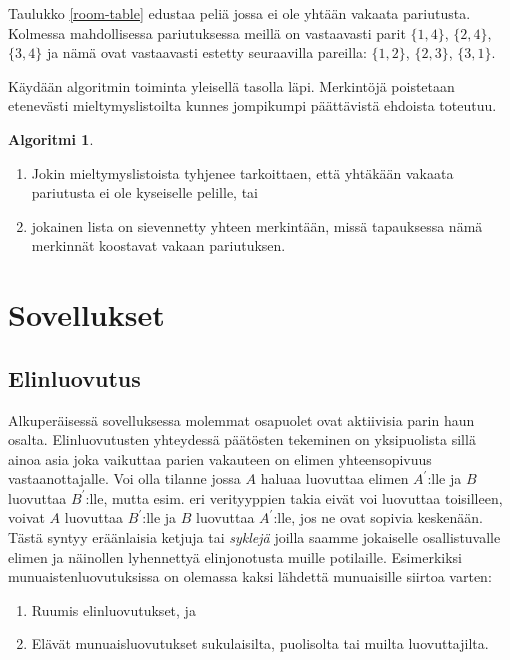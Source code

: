 \documentclass[finnish]{tktltiki2}
\theoremstyle{definition}
\newtheorem{alg}[lau]{Algoritmi}
\theoremstyle{remark}
\begin{document}
Taulukko \ref{room-table} edustaa peliä jossa ei ole yhtään vakaata pariutusta. Kolmessa mahdollisessa pariutuksessa meillä on vastaavasti parit $\{1,4\}$, $\{2,4\}$, $\{3,4\}$ ja nämä ovat vastaavasti estetty seuraavilla pareilla: $\{1,2\}$, $\{2,3\}$, $\{3,1\}$.

Käydään algoritmin toiminta yleisellä tasolla läpi. Merkintöjä poistetaan etenevästi mieltymyslistoilta kunnes jompikumpi päättävistä ehdoista toteutuu. \cite[p, 165]{gusfield1989stable}
\begin{alg}\label{srp1}
\begin{enumerate}
	\item Jokin mieltymyslistoista tyhjenee tarkoittaen, että yhtäkään vakaata pariutusta ei ole kyseiselle pelille, tai
	\item jokainen lista on sievennetty yhteen merkintään, missä tapauksessa nämä merkinnät koostavat vakaan pariutuksen.
\end{enumerate}
\end{alg}

\section{Sovellukset}
\subsection{Elinluovutus}
Alkuperäisessä sovelluksessa molemmat osapuolet ovat aktiivisia parin haun osalta. Elinluovutusten yhteydessä päätösten tekeminen on yksipuolista sillä ainoa asia joka vaikuttaa parien vakauteen on elimen yhteensopivuus vastaanottajalle. Voi olla tilanne jossa $A$ haluaa luovuttaa elimen $A^{'}$:lle ja $B$ luovuttaa $B^{'}$:lle, mutta esim. eri verityyppien takia eivät voi luovuttaa toisilleen, voivat $A$ luovuttaa $B^{'}$:lle ja $B$ luovuttaa $A^{'}$:lle, jos ne ovat sopivia keskenään. Tästä syntyy eräänlaisia ketjuja tai \emph{syklejä} joilla saamme jokaiselle osallistuvalle elimen ja näinollen lyhennettyä elinjonotusta muille potilaille.
Esimerkiksi munuaistenluovutuksissa on olemassa kaksi lähdettä munuaisille siirtoa varten:
\begin{enumerate}
	\item Ruumis elinluovutukset, ja
	\item Elävät munuaisluovutukset sukulaisilta, puolisolta tai muilta luovuttajilta. \cite[s. 6]{NBERw10002}
\end{enumerate}
\end{document}
